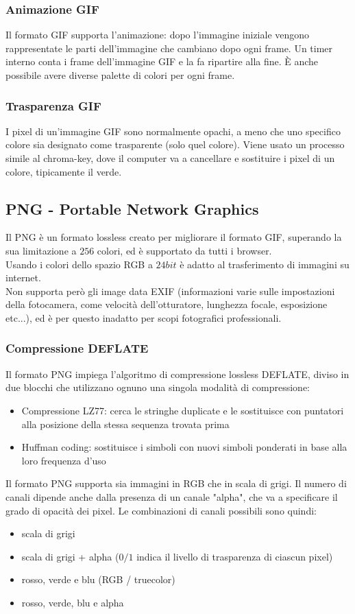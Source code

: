 \documentclass[a4paper,11pt]{article} %
\begin{document}
\subsubsection{Animazione GIF}
Il formato GIF supporta l'animazione: dopo l'immagine iniziale vengono rappresentate le parti dell'immagine che cambiano dopo ogni frame. Un timer interno conta i frame dell'immagine GIF e la fa ripartire alla fine. È anche possibile avere diverse palette di colori per ogni frame.
\subsubsection{Trasparenza GIF}
I pixel di un'immagine GIF sono normalmente opachi, a meno che uno specifico colore sia designato come trasparente (solo quel colore). Viene usato un processo simile al chroma-key, dove il computer va a cancellare e sostituire i pixel di un colore, tipicamente il verde. 

\subsection{PNG - Portable Network Graphics}
Il PNG è un formato lossless creato per migliorare il formato GIF, superando la sua limitazione a $256$ colori, ed è supportato da tutti i browser.\\
Usando i colori dello spazio RGB a $24bit$ è adatto al trasferimento di immagini su internet. \\
Non supporta però gli image data EXIF (informazioni varie sulle impostazioni della fotocamera, come velocità dell'otturatore, lunghezza focale, esposizione etc...), ed è per questo inadatto per scopi fotografici professionali. \\
\subsubsection{Compressione DEFLATE}
Il formato PNG impiega l'algoritmo di compressione lossless DEFLATE, diviso in due blocchi che utilizzano ognuno una singola modalità di compressione:
\begin{itemize}
\item Compressione LZ77: cerca le stringhe duplicate e le sostituisce con puntatori alla posizione della stessa sequenza trovata prima 
\item Huffman coding: sostituisce i simboli con nuovi simboli ponderati in base alla loro frequenza d'uso
\end{itemize}
Il formato PNG supporta sia immagini in RGB che in scala di grigi. Il numero di canali dipende anche dalla presenza di un canale "alpha", che va a specificare il grado di opacità dei pixel. Le combinazioni di canali possibili sono quindi: 
\begin{itemize}
\item scala di grigi
\item scala di grigi + alpha ($0/1$ indica il livello di trasparenza di ciascun pixel)
\item rosso, verde e blu (RGB / truecolor)
\item rosso, verde, blu e alpha
\end{itemize}
\end{document}
